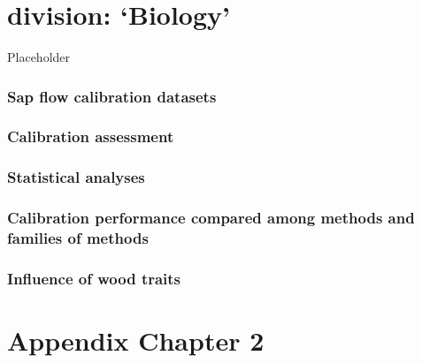 \documentclass[11pt,twoside]{reedthesis}
\begin{document}
\chapter{\texorpdfstring{division:
`Biology'}{division: Biology}}\label{division-biology}

Placeholder

\subsection{Sap flow calibration
datasets}\label{sap-flow-calibration-datasets}

\subsection{Calibration assessment}\label{calibration-assessment}

\subsection{Statistical analyses}\label{statistical-analyses}

\subsection{Calibration performance compared among methods and families
of
methods}\label{calibration-performance-compared-among-methods-and-families-of-methods}

\subsection{Influence of wood traits}\label{influence-of-wood-traits}

\appendix

\chapter{Appendix Chapter 2}\label{appendix-chapter-2}

\newpage

\setlength{\abovecaptionskip}{0pt}

\newpage
\end{document}
